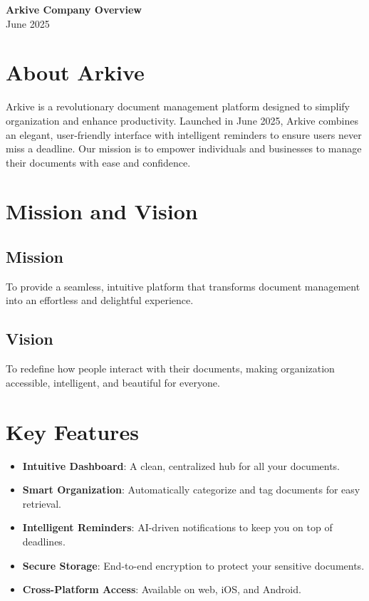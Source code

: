 \documentclass[11pt, a4paper]{article}
\begin{document}
\begin{center}
    {\LARGE\bfseries Arkive Company Overview}\\[0.5cm]
    {\large June 2025}
\end{center}

\section{About Arkive}
Arkive is a revolutionary document management platform designed to simplify organization and enhance productivity. Launched in June 2025, Arkive combines an elegant, user-friendly interface with intelligent reminders to ensure users never miss a deadline. Our mission is to empower individuals and businesses to manage their documents with ease and confidence.

\section{Mission and Vision}
\subsection{Mission}
To provide a seamless, intuitive platform that transforms document management into an effortless and delightful experience.

\subsection{Vision}
To redefine how people interact with their documents, making organization accessible, intelligent, and beautiful for everyone.

\section{Key Features}
\begin{itemize}
    \item \textbf{Intuitive Dashboard}: A clean, centralized hub for all your documents.
    \item \textbf{Smart Organization}: Automatically categorize and tag documents for easy retrieval.
    \item \textbf{Intelligent Reminders}: AI-driven notifications to keep you on top of deadlines.
    \item \textbf{Secure Storage}: End-to-end encryption to protect your sensitive documents.
    \item \textbf{Cross-Platform Access}: Available on web, iOS, and Android.
\end{itemize}
\end{document}

